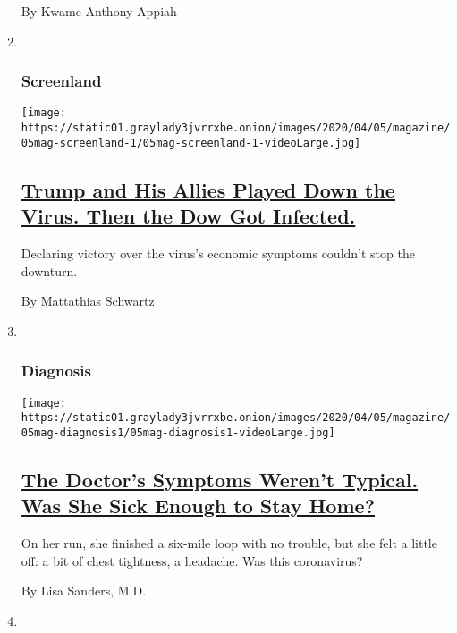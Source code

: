 \begin{enumerate}
  By Kwame Anthony Appiah
\item ~
  \hypertarget{screenland}{%
  \subsubsection{Screenland}\label{screenland}}

  \texttt{[image: https://static01.graylady3jvrrxbe.onion/images/2020/04/05/magazine/05mag-screenland-1/05mag-screenland-1-videoLarge.jpg]}

  \hypertarget{trump-and-his-allies-played-down-the-virus-then-the-dow-got-infected}{%
  \subsection{\texorpdfstring{\href{/2020/03/27/magazine/covid-dow-jones-trump.html}{Trump
  and His Allies Played Down the Virus. Then the Dow Got
  Infected.}}{Trump and His Allies Played Down the Virus. Then the Dow Got Infected.}}\label{trump-and-his-allies-played-down-the-virus-then-the-dow-got-infected}}

  Declaring victory over the virus's economic symptoms couldn't stop the
  downturn.

  By Mattathias Schwartz
\item ~
  \hypertarget{diagnosis}{%
  \subsubsection{Diagnosis}\label{diagnosis}}

  \texttt{[image: https://static01.graylady3jvrrxbe.onion/images/2020/04/05/magazine/05mag-diagnosis1/05mag-diagnosis1-videoLarge.jpg]}

  \hypertarget{the-doctors-symptoms-werent-typical-was-she-sick-enough-to-stay-home}{%
  \subsection{\texorpdfstring{\href{/2020/03/30/magazine/covid-19-symptoms-doctor.html}{The
  Doctor's Symptoms Weren't Typical. Was She Sick Enough to Stay
  Home?}}{The Doctor's Symptoms Weren't Typical. Was She Sick Enough to Stay Home?}}\label{the-doctors-symptoms-werent-typical-was-she-sick-enough-to-stay-home}}

  On her run, she finished a six-mile loop with no trouble, but she felt
  a little off: a bit of chest tightness, a headache. Was this
  coronavirus?

  By Lisa Sanders, M.D.
\item ~
  \hypertarget{eat}{%
}
\end{enumerate}
